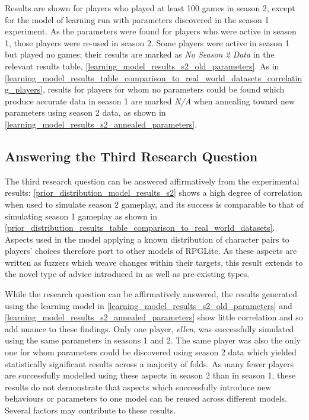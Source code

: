 Results are shown for players who played at least 100 games in season 2, except
for the model of learning run with parameters discovered in the season 1
experiment. As the parameters were found for players who were active in season
1, those players were re-used in season 2. Some players were active in season 1
but played no games; their results are marked as \emph{No Season 2 Data} in the relevant
results table, \cref{learning_model_results_s2_old_parameters}. As in
\cref{learning_model_results_table_comparison_to_real_world_datasets_correlating_players},
results for players for whom no parameters could be found which produce accurate data in
season 1 are marked \emph{N/A} when annealing toward new parameters using season
2 data, as shown in \cref{learning_model_results_s2_annealed_parameters}.




\subsection{Answering the Third Research Question}

The third research question can be answered affirmatively from the experimental
results: \cref{prior_distribution_model_results_s2} shows a high degree of
correlation when used to simulate season 2 gameplay, and its success is
comparable to that of simulating season 1 gameplay as shown in
\cref{prior_distribution_results_table_comparison_to_real_world_datasets}.
Aspects used in the model applying a known distribution of character pairs to
players' choices therefore port to other models of RPGLite. As these aspects are
written as fuzzers which weave changes within their targets, this result extends
to the novel type of advice introduced in \pdsf{} as well as pre-existing types.

While the research question can be affirmatively answered, the results generated
using the learning model in \cref{learning_model_results_s2_old_parameters} and
\cref{learning_model_results_s2_annealed_parameters} show little correlation and
so add nuance to these findings. Only one player, \emph{ellen}, was successfully
simulated using the same parameters in seasons 1 and 2. The same player was also
the only one for whom parameters could be discovered using season 2 data which
yielded statistically significant results across a majority of folds. As many
fewer players are successfully modelled using these aspects in season 2 than in
season 1, these results do not demonstrate that aspects which successfully
introduce new behaviours or parameters to one model can be reused across
different models. Several factors may contribute to these results.

